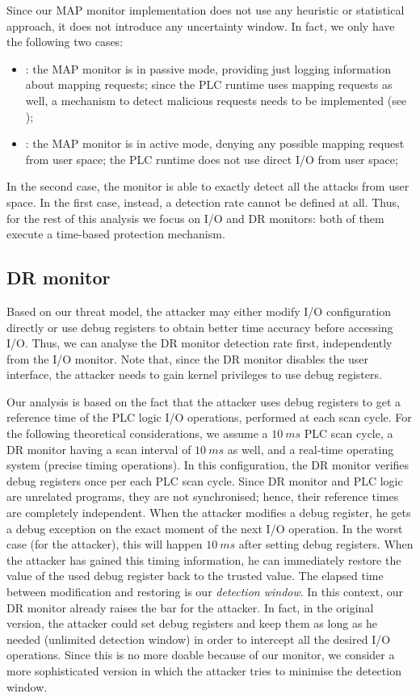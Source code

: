Since our MAP monitor implementation does not use any heuristic or statistical approach, it does not introduce any uncertainty window.
In fact, we only have the following two cases:
\begin{itemize}
	\item {}: the MAP monitor is in passive mode, providing just logging information about mapping requests;
		since the PLC runtime uses mapping requests as well, a mechanism to detect malicious requests needs to be implemented (see );
	\item {}: the MAP monitor is in active mode, denying any possible mapping request from user space; the PLC runtime does not use direct I/O from user space;
\end{itemize}
In the second case, the monitor is able to exactly detect all the attacks from user space. In the first case, instead, a detection rate cannot be defined at all.
Thus, for the rest of this analysis we focus on I/O and DR monitors: both of them execute a time-based protection mechanism.


\subsection{DR monitor}
\label{sec:dr-rate}

Based on our threat model, the attacker may either modify I/O configuration directly or use debug registers to obtain better time accuracy before accessing I/O.
Thus, we can analyse the DR monitor detection rate first, independently from the I/O monitor.
Note that, since the DR monitor disables the user interface, the attacker needs to gain kernel privileges to use debug registers.

Our analysis is based on the fact that the attacker uses debug registers to get a reference time of the PLC logic I/O operations, performed at each scan cycle.
For the following theoretical considerations, we assume a $\SI{10}{ms}$ PLC scan cycle, a DR monitor having a scan interval of $\SI{10}{ms}$ as well,
and a real-time operating system (\ie precise timing operations).
In this configuration, the DR monitor verifies debug registers once per each PLC scan cycle. Since DR monitor and PLC logic are unrelated programs,
they are not synchronised; hence, their reference times are completely independent.
When the attacker modifies a debug register, he gets a debug exception on the exact moment of the next I/O operation.
In the worst case (for the attacker), this will happen $\SI{10}{ms}$ after setting debug registers. When the attacker has gained this timing information,
he can immediately restore the value of the used debug register back to the trusted value. The elapsed time between modification and restoring is our \emph{detection window}.
In this context, our DR monitor already raises the bar for the attacker. In fact, in the original version, the attacker could set debug registers
and keep them as long as he needed (\ie unlimited detection window) in order to intercept all the desired I/O operations.
Since this is no more doable because of our monitor, we consider a more sophisticated version in which the attacker tries to minimise the detection window.

